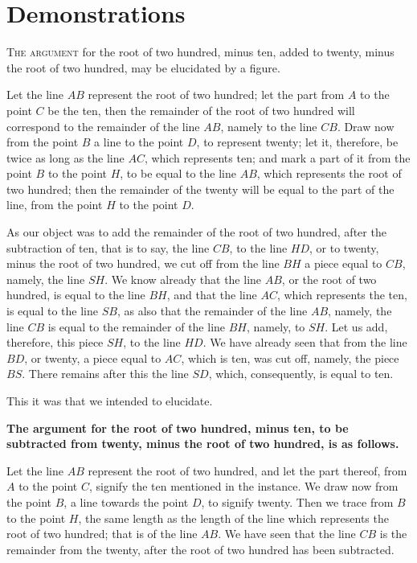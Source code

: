 \clearpage

\section*{Demonstrations}

\lettrine{T}{he argument} for the root of two hundred, minus ten, added to twenty, minus the root of two hundred, may be elucidated by a figure.

Let the line $AB$ represent the root of two hundred; let the part from $A$ to the point $C$ be the ten, then the remainder of the root of two hundred will correspond to the remainder of the line $AB$, namely to the line $CB$. Draw now from the point $B$ a line to the point $D$, to represent twenty; let it, therefore, be twice as long as the line $AC$, which represents ten; and mark a part of it from the point $B$ to the point $H$, to be equal to the line $AB$, which represents the root of two hundred; then the remainder of the twenty will be equal to the part of the line, from the point $H$ to the point $D$.

As our object was to add the remainder of the root of two hundred, after the subtraction of ten, that is to say, the line $CB$, to the line $HD$, or to twenty, minus the root of two hundred, we cut off from the line $BH$ a piece equal to $CB$, namely, the line $SH$. We know already that the line $AB$, or the root of two hundred, is equal to the line $BH$, and that the line $AC$, which represents the ten, is equal to the line $SB$, as also that the remainder of the line $AB$, namely, the line $CB$ is equal to the remainder of the line $BH$, namely, to $SH$. Let us add, therefore, this piece $SH$, to the line $HD$. We have already seen that from the line $BD$, or twenty, a piece equal to $AC$, which is ten, was cut off, namely, the piece $BS$. There remains after this the line $SD$, which, consequently, is equal to ten.

This it was that we intended to elucidate.

\vspace{0.3cm}
\noindent\textbf{The argument for the root of two hundred, minus ten, to be subtracted from twenty, minus the root of two hundred, is as follows.}

Let the line $AB$ represent the root of two hundred, and let the part thereof, from $A$ to the point $C$, signify the ten mentioned in the instance. We draw now from the point $B$, a line towards the point $D$, to signify twenty. Then we trace from $B$ to the point $H$, the same length as the length of the line which represents the root of two hundred; that is of the line $AB$. We have seen that the line $CB$ is the remainder from the twenty, after the root of two hundred has been subtracted.

